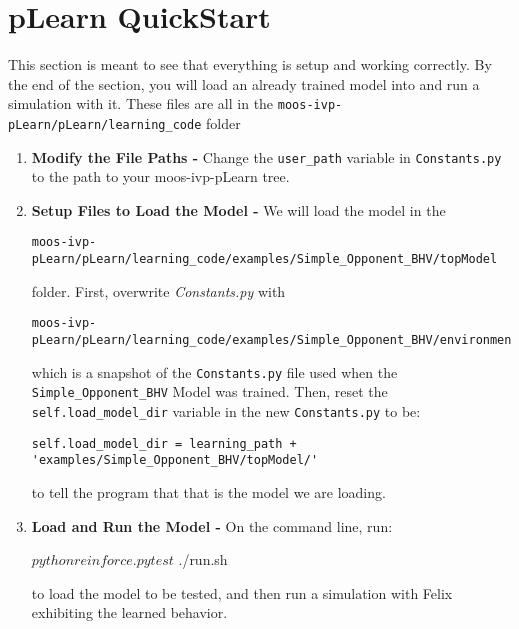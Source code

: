 \documentclass[onecolumn,letterpaper,11pt]{article}
\begin{document}
\section{pLearn QuickStart}
This section is meant to see that everything is setup and working correctly. By the end of the section, you will load an already trained model into  and run a simulation with it. These files are all in the \texttt{moos-ivp-pLearn/pLearn/learning\_code} 
folder 
\begin{enumerate}
	\item \textbf{Modify the File Paths -} Change the \texttt{user\_path} variable in \texttt{Constants.py} to the path to your moos-ivp-pLearn tree.  
	
	\item \textbf{Setup Files to Load the Model -} We will load the model in the
	
	\begin{verbatim} 
moos-ivp-pLearn/pLearn/learning_code/examples/Simple_Opponent_BHV/topModel
	\end{verbatim}
	
	folder. First, overwrite \textit{Constants.py} with
	
	\begin{verbatim} 
moos-ivp-pLearn/pLearn/learning_code/examples/Simple_Opponent_BHV/environment.py
	\end{verbatim}

	\vspace{0.15in}
	 which is a snapshot of the \texttt{Constants.py} file used when the \texttt{Simple\_Opponent\_BHV} Model was trained. Then, reset the \texttt{self.load\_model\_dir} variable in the new \texttt{Constants.py} to be: 
	 
	 \begin{verbatim} 
self.load_model_dir = learning_path + 'examples/Simple_Opponent_BHV/topModel/'
	 \end{verbatim}
 
	to tell the program that that is the model we are loading. 
	
	\item \textbf{Load and Run the Model -} On the command line, run:
	
	\vspace{0.15in}
	\begin{fileverb} 
$ python reinforce.py test
$ ./run.sh 
	\end{fileverb}
	\vspace{0.15in}
	
	to load the model to be tested, and then run a simulation with Felix exhibiting the learned behavior.
\end{enumerate} 
\end{document}
